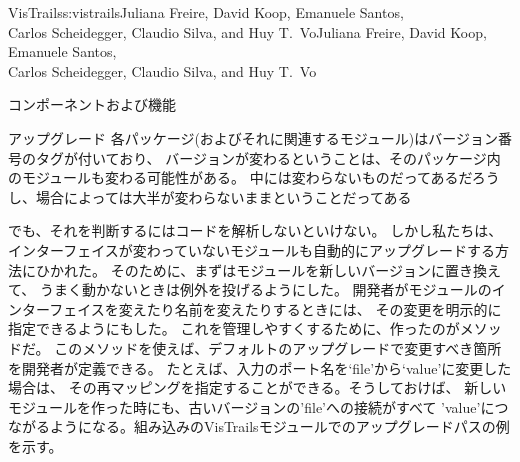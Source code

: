\begin{aosachaptertoc}{VisTrails}{s:vistrails}{Juliana Freire, David Koop, Emanuele Santos, \\ Carlos Scheidegger, Claudio Silva, and Huy T.\ Vo}{Juliana Freire, David Koop, Emanuele Santos, \\ \hspace*{0.9cm} Carlos Scheidegger, Claudio Silva, and Huy T.\ Vo}
\begin{aosasect1}{コンポーネントおよび機能}
\begin{aosasect2}{アップグレード}
各パッケージ(およびそれに関連するモジュール)はバージョン番号のタグが付いており、
バージョンが変わるということは、そのパッケージ内のモジュールも変わる可能性がある。
中には変わらないものだってあるだろうし、場合によっては大半が変わらないままということだってある

でも、それを判断するにはコードを解析しないといけない。
しかし私たちは、インターフェイスが変わっていないモジュールも自動的にアップグレードする方法にひかれた。
そのために、まずはモジュールを新しいバージョンに置き換えて、
うまく動かないときは例外を投げるようにした。
開発者がモジュールのインターフェイスを変えたり名前を変えたりするときには、
その変更を明示的に指定できるようにもした。
これを管理しやすくするために、作ったのがメソッドだ。
このメソッドを使えば、デフォルトのアップグレードで変更すべき箇所を開発者が定義できる。
たとえば、入力のポート名を`file'から`value'に変更した場合は、
その再マッピングを指定することができる。そうしておけば、
新しいモジュールを作った時にも、古いバージョンの'file'への接続がすべて
'value'につながるようになる。組み込みのVisTrailsモジュールでのアップグレードパスの例を示す。


\end{aosasect2}
\end{aosasect1}
\end{aosachaptertoc}
